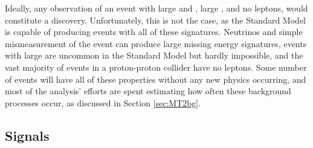   Ideally, any observation of an event with large \met and \mttwo, large \Ht, and no leptons, would constitute a discovery.
  Unfortunately, this is not the case, as the Standard Model is capable of producing events with all of these signatures.
  Neutrinos and simple mismeasurement of the event can produce large missing energy signatures, events with large \Ht are uncommon in the Standard Model but hardly impossible, and the vast majority of events in a proton-proton collider have no leptons.
  Some number of events will have all of these properties without any new physics occurring, and most of the analysis' efforts are spent estimating how often these background processes occur, as discussed in Section \ref{sec:MT2bg}.

  \subsection{Signals} \label{sec:MT2sig}

